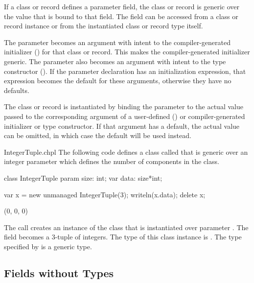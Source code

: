 If a class or record defines a parameter field, the class or record
is generic over the value that is bound to that field.
The field can be accessed from a class or record instance or from the
instantiated class or record type itself.

The parameter becomes an argument with intent  to the
compiler-generated initializer ()
for that class or record.  This makes the compiler-generated
initializer generic.  The parameter also becomes an argument
with intent  to the type  constructor ().
If the parameter declaration has an initialization expression, that expression
becomes the default for these arguments, otherwise they have no defaults.

The class or record is instantiated by binding the parameter
to the actual value passed to the corresponding argument of
a user-defined ()
or compiler-generated initializer or type constructor.
If that argument has a default, the actual value can be omitted, in
which case the default will be used instead.

\begin{chapelexample}{IntegerTuple.chpl}
The following code defines a class called  that is
generic over an integer parameter which defines the number of
components in the class.
\begin{chapel}
class IntegerTuple {
  param size: int;
  var data: size*int;
}
\end{chapel}
\begin{chapelpost}
var x = new unmanaged IntegerTuple(3);
writeln(x.data);
delete x;
\end{chapelpost}
\begin{chapeloutput}
(0, 0, 0)
\end{chapeloutput}
The call  creates an instance of the
 class that is instantiated over parameter
.  The field  becomes a 3-tuple of integers.  The
type of this class instance is .  The type
specified by  is a generic type.
\end{chapelexample}

\subsection{Fields without Types}
\label{Fields_without_Types}

